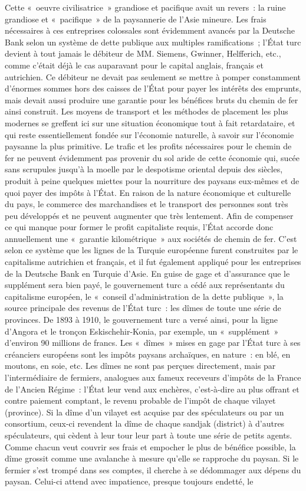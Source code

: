 \documentclass[french,twoside]{book} %
\begin{document}
Cette « oeuvre civilisatrice » grandiose et pacifique avait un revers : la ruine grandiose et « pacifique » de la paysannerie de l’Asie mineure. Les frais nécessaires à ces entreprises colossales sont évidemment avancés par la Deutsche Bank selon un système de dette publique aux multiples ramifications ; l’État turc devient à tout jamais le débiteur de MM. Siemens, Gwinner, Helfferich, etc., comme c’était déjà le cas auparavant pour le capital anglais, français et autrichien. Ce débiteur ne devait pas seulement se mettre à pomper constamment d’énormes sommes hors des caisses de l’État pour payer les intérêts des emprunts, mais devait aussi produire une garantie pour les bénéfices bruts du chemin de fer ainsi construit. Les moyens de transport et les méthodes de placement les plus modernes se greffent ici sur une situation économique tout à fait retardataire, et qui reste essentiellement fondée sur l’économie naturelle, à savoir sur l’économie paysanne la plus primitive. Le trafic et les profits nécessaires pour le chemin de fer ne peuvent évidemment pas provenir du sol aride de cette économie qui, sucée sans scrupules jusqu’à la moelle par le despotisme oriental depuis des siècles, produit à peine quelques miettes pour la nourriture des paysans eux-mêmes et de quoi payer des impôts à l’État. En raison de la nature économique et culturelle du pays, le commerce des marchandises et le transport des personnes sont très peu développés et ne peuvent augmenter que très lentement. Afin de compenser ce qui manque pour former le profit capitaliste requis, l’État accorde donc annuellement une « garantie kilométrique » aux sociétés de chemin de fer. C'est selon ce système que les lignes de la Turquie européenne furent construites par le capitalisme autrichien et français, et il fut également appliqué pour les entreprises de la Deutsche Bank en Turquie d’Asie. En guise de gage et d’assurance que le supplément sera bien payé, le gouvernement turc a cédé aux représentants du capitalisme européen, le « conseil d’administration de la dette publique », la source principale des revenus de l’État turc : les dîmes de toute une série de provinces. De 1893 à 1910, le gouvernement turc a versé ainsi, pour la ligne d’Angora et le tronçon Eskischehir-Konia, par exemple, un « supplément » d’environ 90 millions de francs. Les « dîmes » mises en gage par l’État turc à ses créanciers européens sont les impôts paysans archaïques, en nature : en blé, en moutons, en soie, etc. Les dîmes ne sont pas perçues directement, mais par l’intermédiaire de fermiers, analogues aux fameux receveurs d’impôts de la France de l’Ancien Régime : l’État leur vend aux enchères, c’est-à-dire au plus offrant et contre paiement comptant, le revenu probable de l’impôt de chaque vilayet (province). Si la dîme d’un vilayet est acquise par des spéculateurs ou par un consortium, ceux-ci revendent la dîme de chaque sandjak (district) à d’autres spéculateurs, qui cèdent à leur tour leur part à toute une série de petits agents. Comme chacun veut couvrir ses frais et empocher le plus de bénéfice possible, la dîme grossit comme une avalanche à mesure qu’elle se rapproche du paysan. Si le fermier s’est trompé dans ses comptes, il cherche à se dédommager aux dépens du paysan. Celui-ci attend avec impatience, presque toujours endetté, le 
\end{document}
